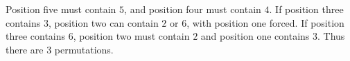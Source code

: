 Position five must contain $5$, and position four must contain $4$. If position three contains $3$, position two can contain $2$ or $6$, with position one forced. If position three contains $6$, position two must contain $2$ and position one contains $3$. Thus there are $\boxed3$ permutations.
